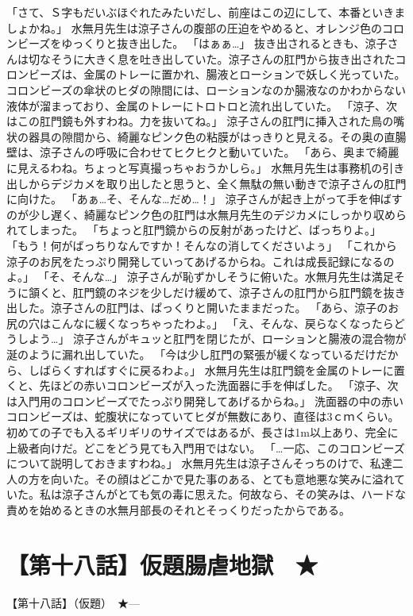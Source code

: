「さて、Ｓ字もだいぶほぐれたみたいだし、前座はこの辺にして、本番といきましょかね。」
水無月先生は涼子さんの腹部の圧迫をやめると、オレンジ色のコロンビーズをゆっくりと抜き出した。
「はぁぁ…」
抜き出されるときも、涼子さんは切なそうに大きく息を吐き出していた。涼子さんの肛門から抜き出されたコロンビーズは、金属のトレーに置かれ、腸液とローションで妖しく光っていた。コロンビーズの傘状のヒダの隙間には、ローションなのか腸液なのかわからない液体が溜まっており、金属のトレーにトロトロと流れ出していた。
「涼子、次はこの肛門鏡も外すわね。力を抜いてね。」
涼子さんの肛門に挿入された鳥の嘴状の器具の隙間から、綺麗なピンク色の粘膜がはっきりと見える。その奥の直腸壁は、涼子さんの呼吸に合わせてヒクヒクと動いていた。
「あら、奥まで綺麗に見えるわね。ちょっと写真撮っちゃおうかしら。」
水無月先生は事務机の引き出しからデジカメを取り出したと思うと、全く無駄の無い動きで涼子さんの肛門に向けた。
「あぁ…そ、そんな…だめ…！」
涼子さんが起き上がって手を伸ばすのが少し遅く、綺麗なピンク色の肛門は水無月先生のデジカメにしっかり収められてしまった。
「ちょっと肛門鏡からの反射があったけど、ばっちりよ。」
「もう！何がばっちりなんですか！そんなの消してくださいよぅ」
「これから涼子のお尻をたっぷり開発していってあげるからね。これは成長記録になるのよ。」
「そ、そんな…」
涼子さんが恥ずかしそうに俯いた。水無月先生は満足そうに頷くと、肛門鏡のネジを少しだけ緩めて、涼子さんの肛門から肛門鏡を抜き出した。涼子さんの肛門は、ぱっくりと開いたままだった。
「あら、涼子のお尻の穴はこんなに緩くなっちゃったわよ。」
「え、そんな、戻らなくなったらどうしよう…」
涼子さんがキュッと肛門を閉じたが、ローションと腸液の混合物が涎のように漏れ出していた。
「今は少し肛門の緊張が緩くなっているだけだから、しばらくすればすぐに戻るわよ。」
水無月先生は肛門鏡を金属のトレーに置くと、先ほどの赤いコロンビーズが入った洗面器に手を伸ばした。
「涼子、次は入門用のコロンビーズでたっぷり開発してあげるからね。」
洗面器の中の赤いコロンビーズは、蛇腹状になっていてヒダが無数にあり、直径は3ｃｍくらい。初めての子でも入るギリギリのサイズではあるが、長さは1m以上あり、完全に上級者向けだ。どこをどう見ても入門用ではない。
「…一応、このコロンビーズについて説明しておきますわね。」
水無月先生は涼子さんそっちのけで、私達二人の方を向いた。その顔はどこかで見た事のある、とても意地悪な笑みに溢れていた。私は涼子さんがとても気の毒に思えた。何故なら、その笑みは、ハードな責めを始めるときの水無月部長のそれとそっくりだったからである。


\section{【第十八話】仮題腸虐地獄　★}
【第十八話】（仮題）　★---

